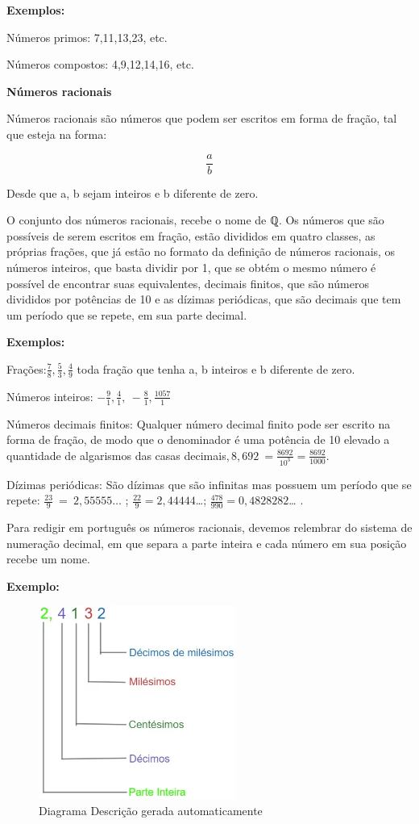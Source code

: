 {\textbf{Exemplos:}

Números primos: 7,11,13,23, etc.

Números compostos: 4,9,12,14,16, etc.

\textbf{Números racionais}

Números racionais são números que podem ser escritos em forma de fração,
tal que esteja na forma:

\[\frac{a}{b}\]

Desde que a, b sejam inteiros e b diferente de zero.

O conjunto dos números racionais, recebe o nome de ℚ. Os números que são
possíveis de serem escritos em fração, estão divididos em quatro
classes, as próprias frações, que já estão no formato da definição de
números racionais, os números inteiros, que basta dividir por 1, que se
obtém o mesmo número é possível de encontrar suas equivalentes, decimais
finitos, que são números divididos por potências de 10 e as dízimas
periódicas, que são decimais que tem um período que se repete, em sua
parte decimal.

\textbf{Exemplos:}

Frações:\(\frac{7}{8},\frac{5}{3},\frac{4}{9}\) toda fração que tenha a,
b inteiros e b diferente de zero.

Números inteiros:
\(- \frac{9}{1},\frac{4}{1},\  - \frac{8}{1},\frac{1057}{1}\)

Números decimais finitos: Qualquer número decimal finito pode ser
escrito na forma de fração, de modo que o denominador é uma potência de
10 elevado a quantidade de algarismos das casas
decimais\(,8,692\  = \frac{8692}{10^{3}} = \frac{8692}{1000}\).

Dízimas periódicas: São dízimas que são infinitas mas possuem um período
que se repete: \(\frac{23}{9}\  = \ 2,55555\ldots\) ;
\(\frac{22}{9} = 2,44444\)\ldots;
\(\frac{478}{990} = 0,4828282\)\ldots{} .

Para redigir em português os números racionais, devemos relembrar do
sistema de numeração decimal, em que separa a parte inteira e cada
número em sua posição recebe um nome.~

\textbf{Exemplo:~}

\begin{figure}
\centering
\includegraphics[width=2.54167in,height=2.5in]{./imgSAEB_7_MAT/media/image1.png}
\caption{Diagrama Descrição gerada automaticamente}
\end{figure}

}
